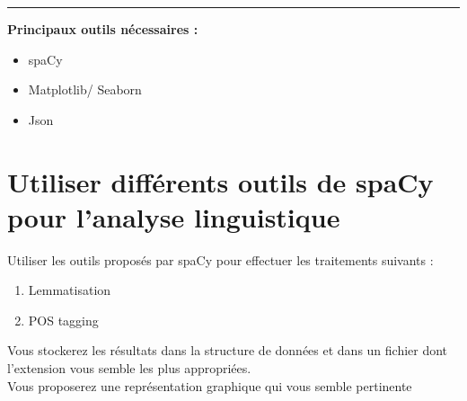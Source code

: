 \newcommand{\numTD}{TD1}
\newcommand{\themeTD}{Analyse en caractères}
\newcommand{\file}{toto.tex}



\hrule

\noindent{}
\newline


\textbf{Principaux outils nécessaires :}
\begin{itemize}
  \item spaCy
  \item Matplotlib/ Seaborn
  \item Json
  
\end{itemize}

\section{Utiliser différents outils de spaCy pour l'analyse linguistique}
Utiliser les outils proposés par spaCy pour effectuer les traitements suivants :
\begin{enumerate}
\item Lemmatisation
\item POS tagging
\end{enumerate}
 Vous stockerez les résultats dans la structure de données et dans un fichier dont l'extension vous semble les plus appropriées.\\
 
 Vous proposerez une représentation graphique qui vous semble pertinente

